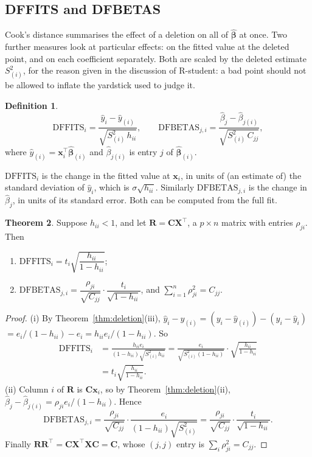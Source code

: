 \documentclass[11pt,a4paper]{article}
\numberwithin{equation}{section}
\theoremstyle{definition}
\newtheorem{thm}{Theorem}[subsection]
\newtheorem{defn}[thm]{Definition}
\begin{document}
\subsection{DFFITS and DFBETAS}
Cook's distance summarises the effect of a deletion on all of $\hat{\boldsymbol\beta}$ at once.
Two further measures look at particular effects: on the fitted value at the deleted point,
and on each coefficient separately. Both are scaled by the deleted estimate $S^2_{(i)}$, for
the reason given in the discussion of R-student: a bad point should not be allowed to
inflate the yardstick used to judge it.

\begin{defn}
\[
\mathrm{DFFITS}_i = \frac{\hat y_i - \hat y_{(i)}}{\sqrt{S^2_{(i)}\,h_{ii}}} ,
\qquad
\mathrm{DFBETAS}_{j,i} = \frac{\hat\beta_j - \hat\beta_{j(i)}}{\sqrt{S^2_{(i)}\,C_{jj}}} ,
\]
where $\hat y_{(i)} = \mathbf{x}_i^\top\hat{\boldsymbol\beta}_{(i)}$ and $\hat\beta_{j(i)}$ is
entry $j$ of $\hat{\boldsymbol\beta}_{(i)}$.
\end{defn}

$\mathrm{DFFITS}_i$ is the change in the fitted value at $\mathbf{x}_i$, in units of (an estimate
of) the standard deviation of $\hat y_i$, which is $\sigma\sqrt{h_{ii}}$. Similarly
$\mathrm{DFBETAS}_{j,i}$ is the change in $\hat\beta_j$, in units of its standard error. Both
can be computed from the full fit.

\begin{thm}\label{thm:dffits}
Suppose $h_{ii} < 1$, and let $\mathbf{R} = \mathbf{C}\mathbf{X}^\top$, a $p \times n$ matrix with
entries $\rho_{ji}$. Then
\begin{enumerate}[label=(\roman*)]
\item $\mathrm{DFFITS}_i = t_i\sqrt{\dfrac{h_{ii}}{1 - h_{ii}}}$;
\item $\mathrm{DFBETAS}_{j,i} = \dfrac{\rho_{ji}}{\sqrt{C_{jj}}}\cdot\dfrac{t_i}{\sqrt{1 - h_{ii}}}$,
and $\sum_{i=1}^n \rho_{ji}^2 = C_{jj}$.
\end{enumerate}
\end{thm}

\begin{proof}
(i) By Theorem~\ref{thm:deletion}(iii), $\hat y_i - \hat y_{(i)} = (y_i - \hat y_{(i)}) - (y_i - \hat y_i)$
$= e_i/(1 - h_{ii}) - e_i = h_{ii}e_i/(1 - h_{ii})$. So
\begin{align*}
\mathrm{DFFITS}_i &= \frac{h_{ii}e_i}{(1 - h_{ii})\sqrt{S^2_{(i)}h_{ii}}}
= \frac{e_i}{\sqrt{S^2_{(i)}(1 - h_{ii})}}\cdot\sqrt{\frac{h_{ii}}{1 - h_{ii}}} \\
&= t_i\sqrt{\frac{h_{ii}}{1 - h_{ii}}} .
\end{align*}
(ii) Column $i$ of $\mathbf{R}$ is $\mathbf{C}\mathbf{x}_i$, so by Theorem~\ref{thm:deletion}(ii),
$\hat\beta_j - \hat\beta_{j(i)} = \rho_{ji}e_i/(1 - h_{ii})$. Hence
\[
\mathrm{DFBETAS}_{j,i} = \frac{\rho_{ji}}{\sqrt{C_{jj}}}\cdot\frac{e_i}{(1 - h_{ii})\sqrt{S^2_{(i)}}}
= \frac{\rho_{ji}}{\sqrt{C_{jj}}}\cdot\frac{t_i}{\sqrt{1 - h_{ii}}} .
\]
Finally $\mathbf{R}\mathbf{R}^\top = \mathbf{C}\mathbf{X}^\top\mathbf{X}\mathbf{C} = \mathbf{C}$, whose
$(j,j)$ entry is $\sum_i \rho_{ji}^2 = C_{jj}$.
\end{proof}
\end{document}
